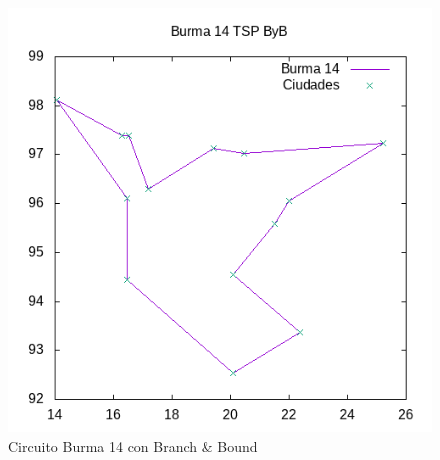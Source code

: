 \documentclass{article}
\begin{document}
	\begin{figure}[H]
		\centering
		\includegraphics[totalheight=6cm]{burma14byb}
		\caption{Circuito Burma 14 con Branch \& Bound}
		\label{fig:b14byb}
	\end{figure}
	
\end{document}
